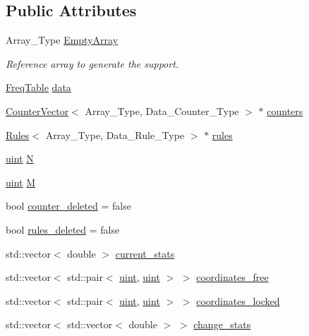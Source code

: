 \subsection*{Public Attributes}
\begin{DoxyCompactItemize}
\item 
Array\+\_\+\+Type \hyperlink{class_support_a3ec1b46e245b89ae007601caaf4958c9}{Empty\+Array}
\begin{DoxyCompactList}\small\item\em Reference array to generate the support. \end{DoxyCompactList}\item 
\hyperlink{class_freq_table}{Freq\+Table} \hyperlink{class_support_a1b7bc59cfcdd9bbdc164c6265917b030}{data}
\item 
\hyperlink{class_counter_vector}{Counter\+Vector}$<$ Array\+\_\+\+Type, Data\+\_\+\+Counter\+\_\+\+Type $>$ $\ast$ \hyperlink{class_support_af56e20c484c8f10a9cce504aaa6b0b1a}{counters}
\item 
\hyperlink{class_rules}{Rules}$<$ Array\+\_\+\+Type, Data\+\_\+\+Rule\+\_\+\+Type $>$ $\ast$ \hyperlink{class_support_a6fc8b2206c3755acbd26d9439e100f3d}{rules}
\item 
\hyperlink{typedefs_8hpp_a91ad9478d81a7aaf2593e8d9c3d06a14}{uint} \hyperlink{class_support_a6c6f707fae03f409c556b6d4668617af}{N}
\item 
\hyperlink{typedefs_8hpp_a91ad9478d81a7aaf2593e8d9c3d06a14}{uint} \hyperlink{class_support_ac0662129b0a12fe4eac69f6f2e733b05}{M}
\item 
bool \hyperlink{class_support_a518268efc16cef68aa2211089c822c03}{counter\+\_\+deleted} = false
\item 
bool \hyperlink{class_support_aab64eca42c25f48f7688eae0bbe9f1ef}{rules\+\_\+deleted} = false
\item 
std\+::vector$<$ double $>$ \hyperlink{class_support_aec5901ad006e5ebe29c7605e7bcc702c}{current\+\_\+stats}
\item 
std\+::vector$<$ std\+::pair$<$ \hyperlink{typedefs_8hpp_a91ad9478d81a7aaf2593e8d9c3d06a14}{uint}, \hyperlink{typedefs_8hpp_a91ad9478d81a7aaf2593e8d9c3d06a14}{uint} $>$ $>$ \hyperlink{class_support_a36f6685c1f22eeca1919dfbb0ff4cb54}{coordinates\+\_\+free}
\item 
std\+::vector$<$ std\+::pair$<$ \hyperlink{typedefs_8hpp_a91ad9478d81a7aaf2593e8d9c3d06a14}{uint}, \hyperlink{typedefs_8hpp_a91ad9478d81a7aaf2593e8d9c3d06a14}{uint} $>$ $>$ \hyperlink{class_support_ab740de5d3497a4bf51cddb256f85cd72}{coordinates\+\_\+locked}
\item 
std\+::vector$<$ std\+::vector$<$ double $>$ $>$ \hyperlink{class_support_a500e5cc6eae028e6323c94641a070843}{change\+\_\+stats}
\end{DoxyCompactItemize}


